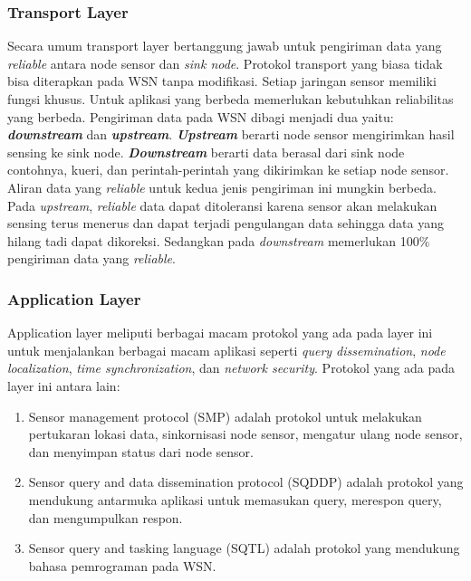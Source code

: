 \subsubsection{Transport Layer}
Secara umum transport layer bertanggung jawab untuk pengiriman data yang \textit{reliable} antara node sensor dan \textit{sink node}. Protokol transport yang biasa tidak bisa diterapkan pada WSN tanpa modifikasi. Setiap jaringan sensor memiliki fungsi khusus. Untuk aplikasi yang berbeda memerlukan kebutuhkan reliabilitas yang berbeda. Pengiriman data pada WSN dibagi menjadi dua yaitu: \textbf{\textit{downstream}} dan \textbf{\textit{upstream}}. \textbf{\textit{Upstream}} berarti node sensor mengirimkan hasil sensing ke sink node. \textbf{\textit{Downstream}} berarti data berasal dari sink node contohnya, kueri, dan perintah-perintah yang dikirimkan ke setiap node sensor. Aliran data yang \textit{reliable} untuk kedua jenis pengiriman ini mungkin berbeda. Pada \textit{upstream}, \textit{reliable} data dapat ditoleransi karena sensor akan melakukan sensing terus menerus dan dapat terjadi pengulangan data sehingga data yang hilang tadi dapat dikoreksi. Sedangkan pada \textit{downstream} memerlukan 100\% pengiriman data yang \textit{reliable}. 


\subsubsection{Application Layer}
Application layer meliputi berbagai macam protokol yang ada pada layer ini untuk menjalankan berbagai macam aplikasi seperti \textit{query dissemination}, \textit{node localization}, \textit{time synchronization}, dan \textit{network security}. Protokol yang ada pada layer ini antara lain:
\begin{enumerate}
	\item Sensor management protocol (SMP) adalah protokol untuk melakukan pertukaran lokasi data, sinkornisasi node sensor, mengatur ulang node sensor, dan menyimpan status dari node sensor.
	\item Sensor query and data dissemination protocol (SQDDP) adalah protokol yang mendukung antarmuka aplikasi untuk memasukan query, merespon query, dan mengumpulkan respon.
	\item Sensor query and tasking language (SQTL) adalah protokol yang mendukung bahasa pemrograman pada WSN.
\end{enumerate}



